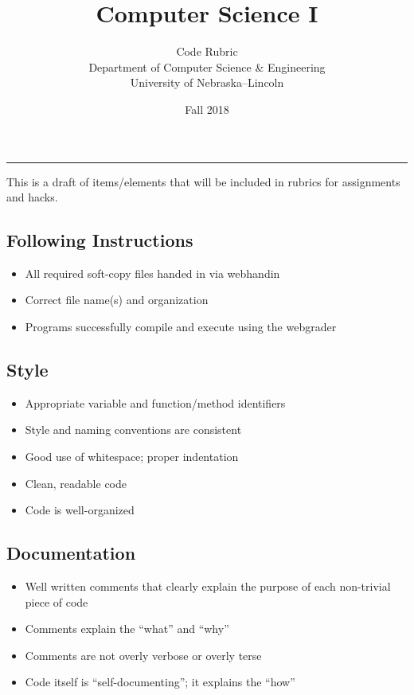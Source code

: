 \documentclass[12pt]{scrartcl}
\title{Computer Science I}\let\Title\@title
\subtitle{Code Rubric\\
{\small
\vskip1cm
Department of Computer Science \& Engineering \\
University of Nebraska--Lincoln}
\vskip-1cm}
\date{Fall 2018}
\begin{document}
\maketitle


\hrule

This is a draft of items/elements that will be included in rubrics for
assignments and hacks.

\subsection*{Following Instructions}
\begin{itemize}
  \item All required soft-copy files handed in via webhandin
  \item Correct file name(s) and organization
  \item Programs successfully compile and execute using the webgrader
\end{itemize}

\subsection*{Style}
\begin{itemize}
  \item Appropriate variable and function/method identifiers
  \item Style and naming conventions are consistent
  \item Good use of whitespace; proper indentation
  \item Clean, readable code
  \item Code is well-organized
\end{itemize}

\subsection*{Documentation}
\begin{itemize}
  \item Well written comments that clearly explain the purpose of each non-trivial piece of code
  \item Comments explain the ``what'' and ``why''
  \item Comments are not overly verbose or overly terse
  \item Code itself is ``self-documenting''; it explains the ``how''
\end{itemize}
\end{document}
